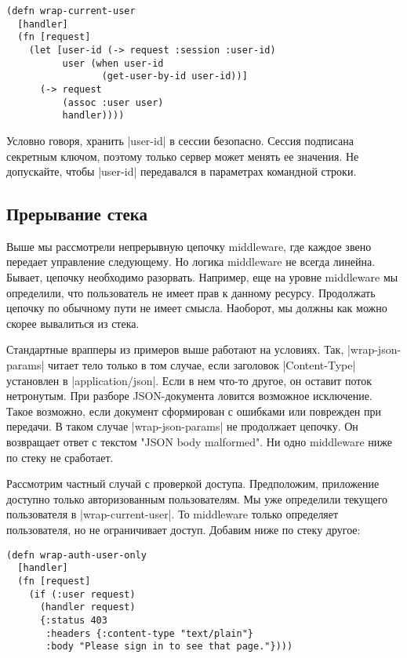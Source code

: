 \begin{verbatim}
(defn wrap-current-user
  [handler]
  (fn [request]
    (let [user-id (-> request :session :user-id)
          user (when user-id
                 (get-user-by-id user-id))]
      (-> request
          (assoc :user user)
          handler))))
\end{verbatim}

Условно говоря, хранить \spverb|user-id| в сессии безопасно. Сессия подписана секретным
ключом, поэтому только сервер может менять ее значения. Не допускайте, чтобы
\spverb|user-id| передавался в параметрах командной строки.

\subsection{Прерывание стека}

Выше мы рассмотрели непрерывную цепочку middleware, где каждое звено передает
управление следующему. Но логика middleware не всегда линейна. Бывает, цепочку
необходимо разорвать. Например, еще на уровне middleware мы определили, что
пользователь не имеет прав к данному ресурсу. Продолжать цепочку по обычному
пути не имеет смысла. Наоборот, мы должны как можно скорее вывалиться из стека.

Стандартные врапперы из примеров выше работают на условиях. Так,
\spverb|wrap-json-params| читает тело только в том случае, если заголовок
\spverb|Content-Type| установлен в \spverb|application/json|. Если в нем что-то другое, он
оставит поток нетронутым. При разборе JSON-документа ловится возможное
исключение. Такое возможно, если документ сформирован с ошибками или поврежден
при передачи. В таком случае \spverb|wrap-json-params| не продолжает цепочку. Он
возвращает ответ с текстом "JSON body malformed". Ни одно middleware ниже по
стеку не сработает.

Рассмотрим частный случай с проверкой доступа. Предположим, приложение доступно
только авторизованным пользователям. Мы уже определили текущего пользователя в
\spverb|wrap-current-user|. То middleware только определяет пользователя, но не
ограничивает доступ. Добавим ниже по стеку другое:

\begin{verbatim}
(defn wrap-auth-user-only
  [handler]
  (fn [request]
    (if (:user request)
      (handler request)
      {:status 403
       :headers {:content-type "text/plain"}
       :body "Please sign in to see that page."})))
\end{verbatim}

